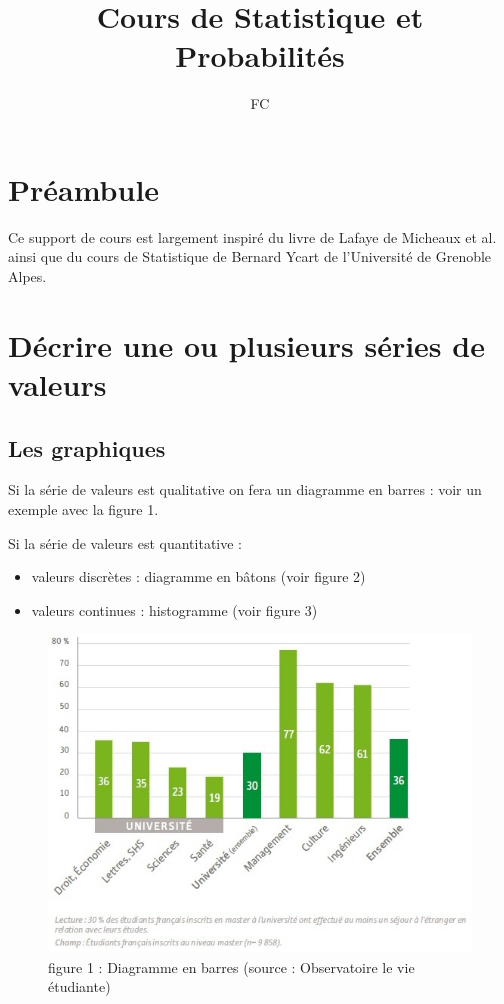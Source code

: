 \documentclass[]{book}
\title{Cours de Statistique et Probabilités}
\author{FC}
\date{}
\providecommand{\tightlist}{%
  \setlength{\itemsep}{0pt}\setlength{\parskip}{0pt}}
\theoremstyle{definition}
\theoremstyle{definition}
\theoremstyle{remark}
\begin{document}
\maketitle

{
\setcounter{tocdepth}{1}
\tableofcontents
}
\chapter{Préambule}\label{preambule}

Ce support de cours est largement inspiré du livre de Lafaye de Micheaux
et al. \cite{LAF} ainsi que du cours de Statistique de Bernard Ycart de
l'Université de Grenoble Alpes.

\chapter{Décrire une ou plusieurs séries de valeurs}\label{intro}

\section{Les graphiques}\label{les-graphiques}

Si la série de valeurs est qualitative on fera un diagramme en barres :
voir un exemple avec la figure 1.

Si la série de valeurs est quantitative :

\begin{itemize}
\tightlist
\item
  valeurs discrètes : diagramme en bâtons (voir figure 2)
\item
  valeurs continues : histogramme (voir figure 3)
\end{itemize}

\begin{figure}[htbp]
\centering
\includegraphics{./figures/figure1.jpg}
\caption{figure 1 : Diagramme en barres (source : Observatoire le vie
étudiante)}
\end{figure}
\end{document}
